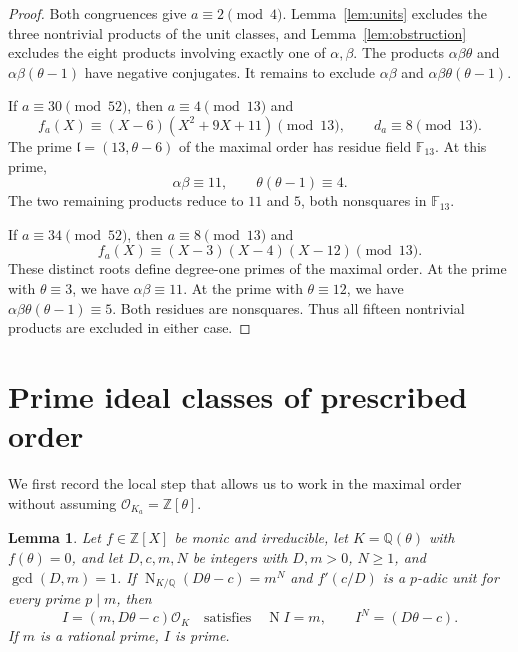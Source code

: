 \documentclass[draft]{publmathdeb}
\newtheorem{lemma}[theorem]{Lemma}
\theoremstyle{remark}
\numberwithin{equation}{section}
\newcommand{\Q}{\mathbb Q}
\newcommand{\Z}{\mathbb Z}
\newcommand{\F}{\mathbb F}
\DeclareMathOperator{\Nm}{N}
\begin{document}
\begin{proof}
  Both congruences give $a\equiv2\pmod4$. Lemma~\ref{lem:units} excludes the three nontrivial products of the unit classes, and Lemma~\ref{lem:obstruction} excludes the eight products involving exactly one of $\alpha,\beta$. The products $\alpha\beta\theta$ and $\alpha\beta(\theta-1)$ have negative conjugates. It remains to exclude $\alpha\beta$ and $\alpha\beta\theta(\theta-1)$.

  If $a\equiv30\pmod{52}$, then $a\equiv4\pmod{13}$ and
  \[
    f_a(X)\equiv(X-6)(X^2+9X+11)\pmod{13},\qquad d_a\equiv8\pmod{13}.
  \]
  The prime $\mathfrak l=(13,\theta-6)$ of the maximal order has residue field $\F_{13}$. At this prime,
  \[
    \alpha\beta\equiv11,\qquad \theta(\theta-1)\equiv4.
  \]
  The two remaining products reduce to $11$ and $5$, both nonsquares in $\F_{13}$.

  If $a\equiv34\pmod{52}$, then $a\equiv8\pmod{13}$ and
  \[
    f_a(X)\equiv(X-3)(X-4)(X-12)\pmod{13}.
  \]
  These distinct roots define degree-one primes of the maximal order. At the prime with $\theta\equiv3$, we have $\alpha\beta\equiv11$. At the prime with $\theta\equiv12$, we have $\alpha\beta\theta(\theta-1)\equiv5$. Both residues are nonsquares. Thus all fifteen nontrivial products are excluded in either case.
\end{proof}

\section{Prime ideal classes of prescribed order}

We first record the local step that allows us to work in the maximal order without assuming $\mathcal O_{K_a}=\Z[\theta]$.

\begin{lemma}\label{lem:local-power}
  Let $f\in\Z[X]$ be monic and irreducible, let $K=\Q(\theta)$ with $f(\theta)=0$, and let $D,c,m,N$ be integers with $D,m>0$, $N\geq1$, and $\gcd(D,m)=1$. If $\Nm_{K/\Q}(D\theta-c)=m^N$ and $f'(c/D)$ is a $p$-adic unit for every prime $p\mid m$, then
  \[
    I=(m,D\theta-c)\mathcal O_K
    \quad\text{satisfies}\quad \Nm I=m,\qquad I^N=(D\theta-c).
  \]
  If $m$ is a rational prime, $I$ is prime.
\end{lemma}
\end{document}
